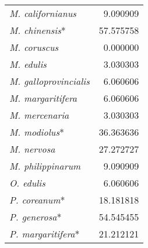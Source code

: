 \documentclass[../main.tex]{subfiles}
\begin{document}
\begin{longtable}{lr}
\textit{M. californianus}            & 9.090909                                                                                                           \\
\textit{M. chinensis}*               & 57.575758                                                                                                          \\
\textit{M. coruscus}                 & 0.000000                                                                                                           \\
\textit{M. edulis}                   & 3.030303                                                                                                           \\
\textit{M. galloprovincialis}        & 6.060606                                                                                                           \\
\textit{M. margaritifera}            & 6.060606                                                                                                           \\
\textit{M. mercenaria}               & 3.030303                                                                                                           \\
\textit{M. modiolus}*                & 36.363636                                                                                                          \\
\textit{M. nervosa}                  & 27.272727                                                                                                          \\
\textit{M. philippinarum}            & 9.090909                                                                                                           \\
\textit{O. edulis}                   & 6.060606                                                                                                           \\
\textit{P. coreanum}*                & 18.181818                                                                                                          \\
\textit{P. generosa}*                & 54.545455                                                                                                          \\
\textit{P. margaritifera}*           & 21.212121                                                                                                          \\

\end{longtable}
\end{document}
